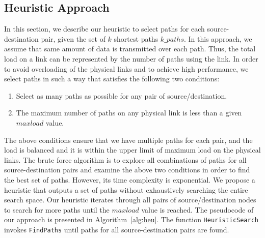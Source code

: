\subsection{Heuristic Approach}
\label{sec:heuristic}

In this section, we describe our heuristic to select paths for each source-destination pair, given the set of $k$ shortest paths $k\_paths$. In this approach, we assume that same amount of data is transmitted over each path. Thus, the total load on a link can be represented by the number of paths using the link. In order to avoid overloading of the physical links and to achieve high performance, we select paths in such a way that satisfies the following two conditions:
\begin{enumerate}
\item Select as many paths as possible for any pair of source/destination. 
\item The maximum number of paths on any physical link is less than a given $maxload$ value.
\end{enumerate}
The above conditions ensure that we have multiple paths for each pair, and the load is balanced and it is within the upper limit of maximum load on the physical links. The brute force algorithm is to explore all combinations of paths for all source-destination pairs and examine the above two conditions in order to find the best set of paths. However, its time complexity is exponential. We propose a heuristic that outputs a set of paths without exhaustively searching the entire search space. Our heuristic iterates through all pairs of source/destination nodes to search for more paths until the $maxload$ value is reached. The pseudocode of our approach is presented in Algorithm~\ref{alg:heu}. The function \texttt{HeuristicSearch} invokes \texttt{FindPaths} until paths for all source-destination pairs are found. 
 
